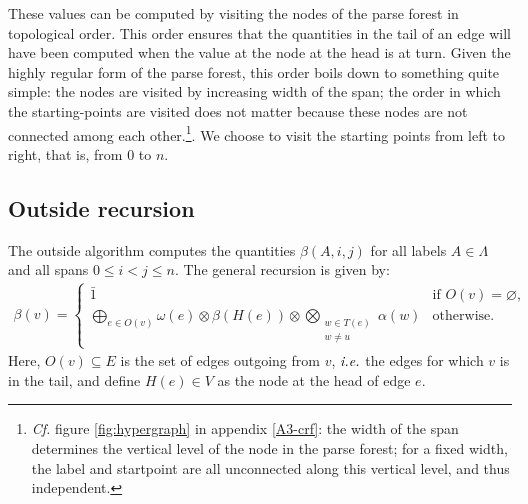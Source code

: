     These values can be computed by visiting the nodes of the parse forest in topological order. This order ensures that the quantities in the tail of an edge will have been computed when the value at the node at the head is at turn. Given the highly regular form of the parse forest, this order boils down to something quite simple: the nodes are visited by increasing width of the span; the order in which the starting-points are visited does not matter because these nodes are not connected among each other.\footnote{\textit{Cf.} figure \ref{fig:hypergraph} in appendix \ref{A3-crf}: the width of the span determines the vertical level of the node in the parse forest; for a fixed width, the label and startpoint are all unconnected along this vertical level, and thus independent.}. We choose to visit the starting points from left to right, that is, from 0 to $n$.

  \subsection{Outside recursion}
    The outside algorithm computes the quantities $\beta(A,i,j)$ for all labels $A \in \Lambda$ and all spans $0 \leq i < j \leq n$. The general recursion is given by:
    \begin{align*}
      \beta(v) =
        \begin{cases}
          \bar{1}  & \mbox{if } O(v) = \varnothing, \\
          \displaystyle\bigoplus_{e \in O(v)} \omega(e) \otimes \beta(H(e)) \otimes \displaystyle\bigotimes_{ \substack{ w \in T(e) \\ w \neq u } } \alpha(w)  & \mbox{otherwise.}
        \end{cases}
    \end{align*}
    Here, $O(v) \subseteq E$ is the set of edges outgoing from $v$, $\emph{i.e.}$ the edges for which $v$ is in the tail, and define $H(e) \in V$ as the node at the head of edge $e$.

